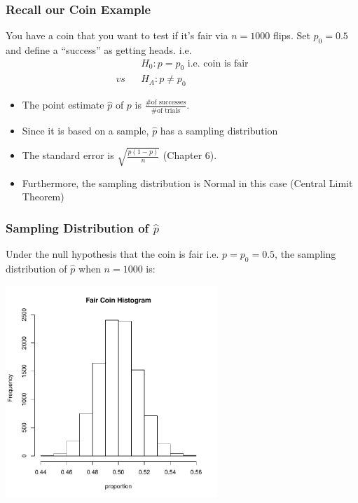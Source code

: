\documentclass[handout]{beamer}
\newcommand{\blue}[1]{\textcolor{blue2}{#1}}
\begin{document}
\begin{frame}
\frametitle{Recall our Coin Example}
You have a coin that you want to test if it's fair via $n=1000$ flips.  Set $p_0 = 0.5$ and define a ``success'' as getting heads.  \pause i.e.
\begin{eqnarray*}
&& H_0: p = p_0 \mbox{ i.e. coin is fair}\\
vs && H_A: p \neq p_0
\end{eqnarray*}

\begin{itemize}
\pause \item The point estimate $\widehat{p}$ of $p$ is $\frac{\mbox{\# of successes}}{\mbox{\# of trials}}$.
\pause \item Since it is based on a sample, $\widehat{p}$ has a sampling distribution
\pause \item The standard error is $\sqrt{\frac{p(1-p)}{n}}$ (Chapter 6).
\pause \item Furthermore, the sampling distribution is Normal in this case (Central Limit Theorem)
\end{itemize}

\end{frame}


\begin{frame}
\frametitle{Sampling Distribution of $\widehat{p}$}
\blue{Under the null hypothesis that the coin is fair} i.e. $p=p_0=0.5$, the sampling distribution of $\widehat{p}$ when $n=1000$ is:

\begin{center}
\includegraphics[width=0.6\textwidth]{figure/hist1}
\end{center}
\end{frame}
\end{document}
